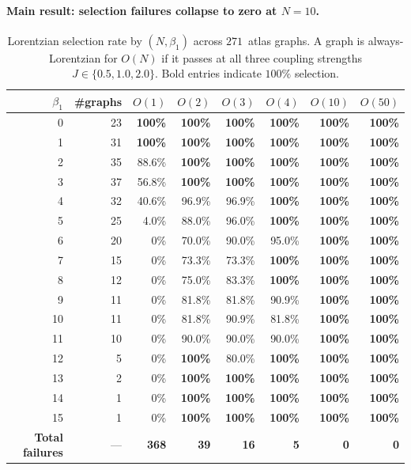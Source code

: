 \documentclass[11pt]{article}
\theoremstyle{definition}
\theoremstyle{remark}
\begin{document}
\paragraph{Main result: selection failures collapse to zero at $N = 10$.}

\begin{table}[htbp]
\centering
\caption{Lorentzian selection rate by $(N, \beta_1)$ across $271$~atlas graphs.
A graph is always-Lorentzian for $O(N)$ if it passes at all three coupling
strengths $J \in \{0.5, 1.0, 2.0\}$.
Bold entries indicate $100\%$ selection.}
\label{tab:on-hierarchy}
\begin{tabular}{@{}rrrrrrrr@{}}
\toprule
$\beta_1$ & \#graphs & $O(1)$ & $O(2)$ & $O(3)$ & $O(4)$ & $O(10)$ & $O(50)$ \\
\midrule
0  & 23 & \textbf{100\%} & \textbf{100\%} & \textbf{100\%} & \textbf{100\%} & \textbf{100\%} & \textbf{100\%} \\
1  & 31 & \textbf{100\%} & \textbf{100\%} & \textbf{100\%} & \textbf{100\%} & \textbf{100\%} & \textbf{100\%} \\
2  & 35 & 88.6\% & \textbf{100\%} & \textbf{100\%} & \textbf{100\%} & \textbf{100\%} & \textbf{100\%} \\
3  & 37 & 56.8\% & \textbf{100\%} & \textbf{100\%} & \textbf{100\%} & \textbf{100\%} & \textbf{100\%} \\
4  & 32 & 40.6\% & 96.9\% & 96.9\% & \textbf{100\%} & \textbf{100\%} & \textbf{100\%} \\
5  & 25 & 4.0\%  & 88.0\% & 96.0\% & \textbf{100\%} & \textbf{100\%} & \textbf{100\%} \\
6  & 20 & 0\%    & 70.0\% & 90.0\% & 95.0\% & \textbf{100\%} & \textbf{100\%} \\
7  & 15 & 0\%    & 73.3\% & 73.3\% & \textbf{100\%} & \textbf{100\%} & \textbf{100\%} \\
8  & 12 & 0\%    & 75.0\% & 83.3\% & \textbf{100\%} & \textbf{100\%} & \textbf{100\%} \\
9  & 11 & 0\%    & 81.8\% & 81.8\% & 90.9\% & \textbf{100\%} & \textbf{100\%} \\
10 & 11 & 0\%    & 81.8\% & 90.9\% & 81.8\% & \textbf{100\%} & \textbf{100\%} \\
11 & 10 & 0\%    & 90.0\% & 90.0\% & 90.0\% & \textbf{100\%} & \textbf{100\%} \\
12 & 5  & 0\%    & \textbf{100\%} & 80.0\% & \textbf{100\%} & \textbf{100\%} & \textbf{100\%} \\
13 & 2  & 0\%    & \textbf{100\%} & \textbf{100\%} & \textbf{100\%} & \textbf{100\%} & \textbf{100\%} \\
14 & 1  & 0\%    & \textbf{100\%} & \textbf{100\%} & \textbf{100\%} & \textbf{100\%} & \textbf{100\%} \\
15 & 1  & 0\%    & \textbf{100\%} & \textbf{100\%} & \textbf{100\%} & \textbf{100\%} & \textbf{100\%} \\
\midrule
\textbf{Total failures} & --- & \textbf{368} & \textbf{39} & \textbf{16} & \textbf{5} & \textbf{0} & \textbf{0} \\
\bottomrule
\end{tabular}
\end{table}
\end{document}
